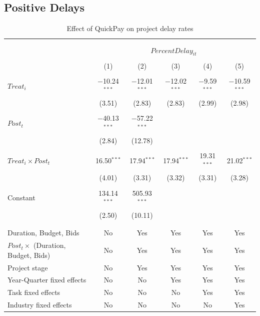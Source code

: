 \documentclass[
]{article}
\begin{document}
\hypertarget{positive-delays}{%
\subsection{Positive Delays}\label{positive-delays}}

\begin{table}[H] \centering 
  \caption{Effect of QuickPay on project delay rates} 
  \label{} 
\small 
\begin{tabular}{@{\extracolsep{-2pt}}lccccc} 
\\[-1.8ex]\hline 
\hline \\[-1.8ex] 
\\[-1.8ex] & \multicolumn{5}{c}{$PercentDelay_{it}$} \\ 
\\[-1.8ex] & (1) & (2) & (3) & (4) & (5)\\ 
\hline \\[-1.8ex] 
 $Treat_i$ & $-$10.24$^{***}$ & $-$12.01$^{***}$ & $-$12.02$^{***}$ & $-$9.59$^{***}$ & $-$10.59$^{***}$ \\ 
  & (3.51) & (2.83) & (2.83) & (2.99) & (2.98) \\ 
  & & & & & \\ 
 $Post_t$ & $-$40.13$^{***}$ & $-$57.22$^{***}$ &  &  &  \\ 
  & (2.84) & (12.78) &  &  &  \\ 
  & & & & & \\ 
 $Treat_i \times Post_t$ & 16.50$^{***}$ & 17.94$^{***}$ & 17.94$^{***}$ & 19.31$^{***}$ & 21.02$^{***}$ \\ 
  & (4.01) & (3.31) & (3.32) & (3.31) & (3.28) \\ 
  & & & & & \\ 
 Constant & 134.14$^{***}$ & 505.93$^{***}$ &  &  &  \\ 
  & (2.50) & (10.11) &  &  &  \\ 
  & & & & & \\ 
\hline \\[-1.8ex] 
Duration, Budget, Bids & No & Yes & Yes & Yes & Yes \\ 
$Post_t \times$  (Duration, Budget, Bids) & No & Yes & Yes & Yes & Yes \\ 
Project stage & No & Yes & Yes & Yes & Yes \\ 
Year-Quarter fixed effects & No & No & Yes & Yes & Yes \\ 
Task fixed effects & No & No & No & Yes & Yes \\ 
Industry fixed effects & No & No & No & No & Yes \\ 

\end{tabular}
\end{table}
\end{document}
